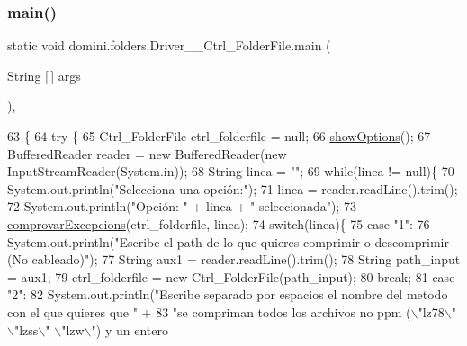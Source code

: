 \subsubsection{\texorpdfstring{main()}{main()}}
{\footnotesize\ttfamily static void domini.\+folders.\+Driver\+\_\+\+\_\+\+Ctrl\+\_\+\+Folder\+File.\+main (\begin{DoxyParamCaption}\item[{String \mbox{[}$\,$\mbox{]}}]{args }\end{DoxyParamCaption})\hspace{0.3cm}{\ttfamily [inline]}, {\ttfamily [static]}}


\begin{DoxyCode}
63                                            \{
64     \textcolor{keywordflow}{try} \{
65         Ctrl\_FolderFile ctrl\_folderfile = null;
66         \hyperlink{classdomini_1_1folders_1_1Driver____Ctrl__FolderFile_a5343134690950988d119d5e124edb1b4}{showOptions}();
67         BufferedReader reader = \textcolor{keyword}{new} BufferedReader(\textcolor{keyword}{new} InputStreamReader(System.in));
68         String linea = \textcolor{stringliteral}{""};
69         \textcolor{keywordflow}{while}(linea != null)\{
70             System.out.println(\textcolor{stringliteral}{"Selecciona una opción:"});
71             linea = reader.readLine().trim();
72             System.out.println(\textcolor{stringliteral}{"Opción: "} + linea + \textcolor{stringliteral}{" seleccionada"});
73             \hyperlink{classdomini_1_1folders_1_1Driver____Ctrl__FolderFile_add85c568af9cc21b5b4dc8c413b8d565}{comprovarExcepcions}(ctrl\_folderfile, linea);
74             \textcolor{keywordflow}{switch}(linea)\{
75                 \textcolor{keywordflow}{case} \textcolor{stringliteral}{"1"}:
76                     System.out.println(\textcolor{stringliteral}{"Escribe el path de lo que quieres comprimir o descomprimir (No
       cableado)"});
77                     String aux1 = reader.readLine().trim();
78                     String path\_input = aux1;
79                     ctrl\_folderfile = \textcolor{keyword}{new} Ctrl\_FolderFile(path\_input);
80                 \textcolor{keywordflow}{break};
81                 \textcolor{keywordflow}{case} \textcolor{stringliteral}{"2"}:
82                     System.out.println(\textcolor{stringliteral}{"Escribe separado por espacios el nombre del metodo con el que
       quieres que "} +
83                             \textcolor{stringliteral}{"se compriman todos los archivos no ppm (\(\backslash\)"lz78\(\backslash\)" \(\backslash\)"lzss\(\backslash\)" \(\backslash\)"lzw\(\backslash\)") y un entero
}
\end{DoxyCode}
